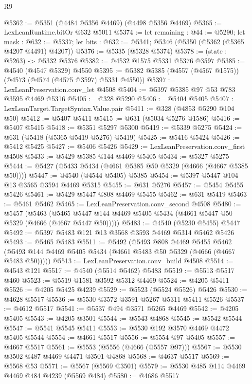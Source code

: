 \begin{lexlean}{R9}
\begin{coremodule}
@5362 := @5351 (@4484 @5356 @4469) (@4498 @5356 @4469)
@5365 := LexLeanRuntime.bitOr @632 @5011
@5374 := let remaining : @44 := @5290;
  let mask : @632 := @5337;
  let bits : @632 := @5341; @5346 (@5350 (@5362 (@5365 @4207 @4491) @4207))
@5376 := @5335 (@5328 @5374)
@5378 := (state : @5263) -> @5332 @5376
@5382 := @4532 @1575 @5331 @5376 @3597
@5385 := @4540 (@4547 @5329) @4550
@5395 := @5382 @5385 (@4557 (@4567 @1575)) (@4573 (@4574 (@4575 @3597) @5331 @4550))
@5397 := LexLeanPreservation.conv_let @4508
@5404 := @5397 @5385 @97 @53 @783 @3595 @4469 @5316
@5405 := @328 @5290
@5406 := @5404 @5405
@5407 := LexLeanTarget.TargetSyntax.Value.pair
@5411 := @328 (@4853 @5290 @104 @50)
@5412 := @5407 @5411
@5415 := @631 (@5034 @5276 @1586)
@5416 := @5407 @5415
@5418 := @5351 @5297 @5300
@5419 := @5339 @5275
@5424 := @631 (@5418 (@5365 @5419 @5276) @5419)
@5425 := @5416 @5424
@5426 := @5412 @5425
@5427 := @5406 @5426
@5429 := LexLeanPreservation.conv_first @4508
@5433 := @5429 @5385 @144 @4469 @5405
@5434 := @5327 @5275
@5444 := @5427 (@5433 @5434 (@4661 @5385 @50 @5329 (@4666 (@4667 @5385 @50))))
@5447 := @4540 (@4544 @5405) @5385
@5454 := @5397 @5447 @104 @13 @3565 @3594 @4469 @5315
@5455 := @631 @5276
@5457 := @5454 @5455 @5426
@5461 := @5429 @5447 @808 @4469 @5455
@5462 := @631 @5419
@5463 := @5461 @5462
@5465 := LexLeanPreservation.conv_second @4508
@5480 := @5457
    (@5463 (@5465 @5447 @144 @4469 @5405 @5434 (@4661 @5447 @50 @5329 (@4666 (@4667 @5447 @50)))))
@5483 := @4540 (@5230 @5455) @5447
@5492 := @5397 @5483 @121 @13 @3568 @3593 @4469 @5314 @5462 @5426
@5493 := @5465 @5483
@5511 := @5492
    (@5493
      @808
      @4469
      @5455
      @5462
      (@5493 @144 @4469 @5405 @5434 (@4661 @5483 @50 @5329 (@4666 (@4667 @5483 @50)))))
@5513 := LexLeanPreservation.conv_build @4508
@5514 := @4543 @121
@5517 := @4540 (@5514 @5462) @5483
@5519 := @5513 @5517 @460
@5523 := @5519 @1581 @3592 @5312 @4469
@5524 := @4205 @5411
@5526 := @4205 @5425 @4239
@5529 := @5523 (@5524 @5526) @5426
@5530 := @4628 @5517
@5536 := @5530 @3572 @3591 @5267 @5311 @5411 @5526
@5537 := @4612 @5517
@5541 := @5537 @494 @3571 @5265 @4469
@5542 := @4205 @5405
@5543 := @4205 @3501
@5544 := @5543 @4868
@5545 := @5542 @5544
@5547 := @5541 @5545 @5411
@5553 := @5530 @192 @3570 @4469 @4472 @5405 @5544
@5554 := @4661 @5517
@5556 := @5554 @97 @5405
@5557 := @4667 @5517
@5561 := @5553 (@5556 (@4666 (@5557 @97)))
@5567 := @5530 @3502 @487 @4469 @4471 @3501 @4868
@5568 := @4637 @5517
@5569 := @5568 @53
@5571 := @5567 (@5569 @3501)
@5579 := @5530 @485 @114 @4469 @4469 @484 @4239 (@5569 @484)
@5580 := @4686 @5517

\end{coremodule}
\end{lexlean}
